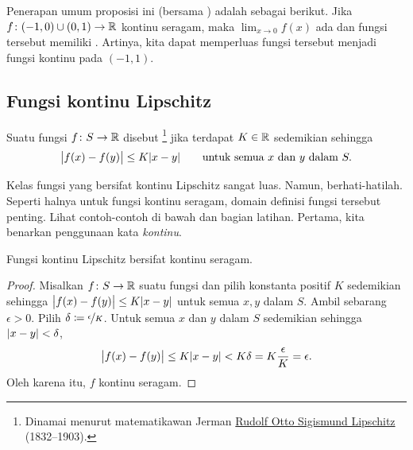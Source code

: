 Penerapan umum proposisi ini (bersama
)
adalah sebagai berikut.
Jika $f \colon (-1,0) \cup (0,1) \to {\mathbb{R}}$ kontinu seragam,
maka $\lim_{x\to 0} f(x)$ ada dan fungsi tersebut
memiliki \emph{}.
Artinya,
kita dapat memperluas fungsi tersebut menjadi fungsi kontinu pada $(-1,1)$.


\subsection{Fungsi kontinu Lipschitz}

\begin{defn}
Suatu fungsi $f \colon S \to {\mathbb{R}}$
disebut \emph{}%
\footnote{Dinamai menurut matematikawan Jerman
\href{https://en.wikipedia.org/wiki/Rudolf_Lipschitz}{Rudolf Otto Sigismund Lipschitz}
(1832--1903).} jika terdapat $K \in {\mathbb{R}}$ sedemikian sehingga
\begin{equation*}
\bigl\lvert {f(x)-f(y)} \bigr\rvert \leq K \lvert {x-y} \rvert 
\qquad \text{untuk semua } x \text{ dan } y \text{ dalam } S.
\end{equation*}
\end{defn}

Kelas fungsi yang bersifat kontinu Lipschitz sangat luas.  Namun, berhati-hatilah.
Seperti halnya untuk fungsi kontinu seragam,
domain definisi fungsi tersebut penting.  Lihat contoh-contoh di bawah
dan bagian latihan.  Pertama, kita benarkan penggunaan kata \emph{kontinu}.

\begin{prop}
Fungsi kontinu Lipschitz bersifat kontinu seragam.
\end{prop}

\begin{proof}
Misalkan $f \colon S \to {\mathbb{R}}$ suatu fungsi dan pilih konstanta positif $K$ sedemikian sehingga
$\bigl\lvert {f(x)-f(y)} \bigr\rvert \leq K \lvert {x-y} \rvert$
untuk semua $x, y$ dalam $S$.
Ambil sebarang $\epsilon > 0$.  Pilih $\delta \coloneqq
\nicefrac{\epsilon}{K}$.
Untuk semua $x$ dan $y$ dalam $S$ sedemikian sehingga
$\lvert {x-y} \rvert < \delta$,
\begin{equation*}
\bigl\lvert {f(x)-f(y)} \bigr\rvert \leq K \lvert {x-y} \rvert < K \delta = K \frac{\epsilon}{K} =
\epsilon .
\end{equation*}
Oleh karena itu, $f$ kontinu seragam.
\end{proof}

